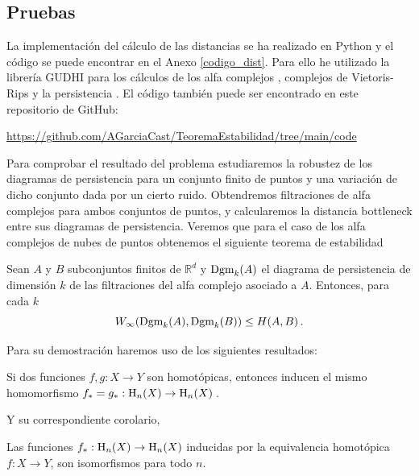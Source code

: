 \subsection{Pruebas}
La implementación del cálculo de las distancias se ha realizado en Python y el código se puede encontrar en el Anexo \ref{codigo_dist}. Para ello he utilizado la librería GUDHI para los cálculos de los alfa complejos \cite{gudhi:AlphaComplex}, complejos de Vietoris-Rips \cite{gudhi:RipsComplex} y la persistencia \cite{gudhi:PersistenceRepresentations}. El código también puede ser encontrado en este repositorio de GitHub:

\begin{center}
\url{https://github.com/AGarciaCast/TeoremaEstabilidad/tree/main/code}
\end{center}

Para comprobar el resultado del problema estudiaremos la robustez de los diagramas de persistencia para un conjunto finito de puntos y una variación de dicho conjunto dada por un cierto ruido. Obtendremos filtraciones de alfa complejos para ambos conjuntos de puntos, y calcularemos la distancia bottleneck entre sus diagramas de persistencia. Veremos que para el caso de los alfa complejos de nubes de puntos obtenemos el siguiente teorema de estabilidad

\begin{theorem}\label{th:estabilidadAlfa}
Sean $A$ y $B$ subconjuntos finitos de $\mathbb{R}^d$ y $\text{\rm Dgm}_k(A)$ el diagrama de persistencia de dimensión $k$ de las filtraciones del alfa complejo asociado a $A$. Entonces, para cada $k$
\[
W_\infty(\text{\rm Dgm}_k(A), \text{\rm Dgm}_k(B)) \leq H(A, B)\,.
\]
\end{theorem}

Para su demostración haremos uso de los siguientes resultados:

\begin{theorem}
\begin{sloppypar}
Si dos funciones $f, g: X \to Y$ son homotópicas, entonces inducen el mismo homomorfismo  ${f_*=g_*:\text{\rm H}_n(X) \to \text{\rm H}_n(X)}\,$.
\end{sloppypar}
\end{theorem}
Y su correspondiente corolario,
\begin{corollary}\label{cor:homotopia}
Las funciones $f_*:\text{\rm H}_n(X) \to \text{\rm H}_n(X)$ inducidas por la equivalencia homotópica $f:X \to Y$, son isomorfismos para todo $n$.
\end{corollary}

